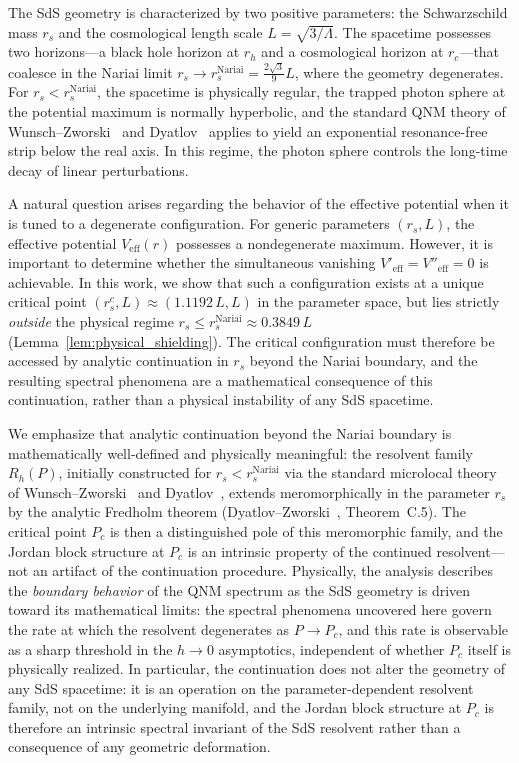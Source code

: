 \documentclass[12pt,a4paper]{amsart}
\theoremstyle{remark}
\begin{document}
The SdS geometry is characterized by two positive parameters: the Schwarzschild mass
$r_s$ and the cosmological length scale $L = \sqrt{3/\Lambda}$. The spacetime possesses
two horizons---a black hole horizon at $r_h$ and a cosmological horizon at $r_c$---that
coalesce in the Nariai limit $r_s \to r_s^{\mathrm{Nariai}} = \frac{2\sqrt{3}}{9}L$,
where the geometry degenerates. For $r_s < r_s^{\mathrm{Nariai}}$, the spacetime is
physically regular, the trapped photon sphere at the potential maximum is normally
hyperbolic, and the standard QNM theory of Wunsch--Zworski~\cite{WZ11} and
Dyatlov~\cite{Dyatlov11} applies to yield an exponential resonance-free strip below
the real axis. In this regime, the photon sphere controls the long-time decay of
linear perturbations.

A natural question arises regarding the behavior of the effective potential when it
is tuned to a degenerate configuration. For generic parameters $(r_s, L)$, the effective
potential $V_{\mathrm{eff}}(r)$ possesses a nondegenerate maximum. However, it is
important to determine whether the simultaneous vanishing $V'_{\mathrm{eff}} = V''_{\mathrm{eff}} = 0$
is achievable. In this work, we show that such a configuration exists at a unique critical point
$(r_s^c, L) \approx (1.1192\,L, L)$ in the parameter space, but lies strictly \emph{outside}
the physical regime $r_s \leq r_s^{\mathrm{Nariai}} \approx 0.3849\,L$ (Lemma~\ref{lem:physical_shielding}).
The critical configuration must therefore be accessed by analytic continuation in $r_s$
beyond the Nariai boundary, and the resulting spectral phenomena are a mathematical
consequence of this continuation, rather than a physical instability of any SdS spacetime.

We emphasize that analytic continuation beyond the Nariai boundary is mathematically
well-defined and physically meaningful: the resolvent family $R_h(P)$, initially
constructed for $r_s < r_s^{\mathrm{Nariai}}$ via the standard microlocal theory of
Wunsch--Zworski~\cite{WZ11} and Dyatlov~\cite{Dyatlov11}, extends meromorphically
in the parameter $r_s$ by the analytic Fredholm theorem
(Dyatlov--Zworski~\cite{DZ19}, Theorem~C.5).
The critical point $P_c$ is then a distinguished pole of this meromorphic family,
and the Jordan block structure at $P_c$ is an intrinsic property of the continued
resolvent---not an artifact of the continuation procedure.
Physically, the analysis describes the \emph{boundary behavior} of the QNM spectrum
as the SdS geometry is driven toward its mathematical limits: the spectral phenomena
uncovered here govern the rate at which the resolvent degenerates as $P \to P_c$,
and this rate is observable as a sharp threshold in the $h \to 0$ asymptotics,
independent of whether $P_c$ itself is physically realized.
In particular, the continuation does not alter the geometry of any SdS spacetime:
it is an operation on the parameter-dependent resolvent family, not on the underlying
manifold, and the Jordan block structure at $P_c$ is therefore an intrinsic spectral
invariant of the SdS resolvent rather than a consequence of any geometric deformation.
\end{document}
